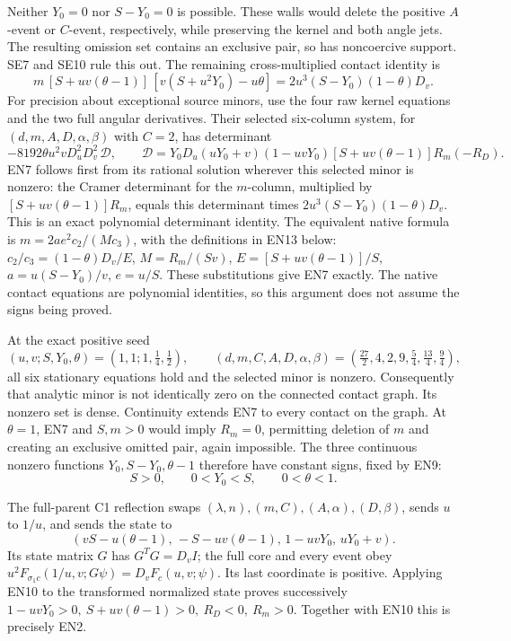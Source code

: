 Neither \(Y_0=0\) nor \(S-Y_0=0\) is possible.  These walls would delete
the positive \(A\)-event or \(C\)-event, respectively, while preserving
the kernel and both angle jets.  The resulting omission set contains
an exclusive pair, so has noncoercive support.  SE7 and SE10 rule this out.
The remaining cross-multiplied contact identity is
\[
 m\,[S+uv(\theta-1)]\,
       [v(S+u^2Y_0)-u\theta]
   =2u^3(S-Y_0)(1-\theta)D_v .
 \tag{EN7}
\]
For precision about exceptional source minors, use the four raw kernel
equations and the two full angular derivatives.  Their selected six-column
system, for \((d,m,A,D,\alpha,\beta)\) with \(C=2\), has
determinant
\[
 -8192\theta u^2vD_u^2D_v^2\,\mathcal D,\qquad
 \mathcal D=Y_0D_u(uY_0+v)(1-uvY_0)
 [S+uv(\theta-1)]R_m(-R_D).
 \tag{EN8}
\]
EN7 follows first from its rational solution wherever this selected
minor is nonzero: the Cramer determinant for the \(m\)-column,
multiplied by \([S+uv(\theta-1)]R_m\), equals this determinant
times \(2u^3(S-Y_0)(1-\theta)D_v\).  This is an exact
polynomial determinant identity.  The equivalent native formula is
\(m=2ae^2c_2/(Mc_3)\), with the definitions in EN13 below:
\(c_2/c_3=(1-\theta)D_v/E\),
\(M=R_m/(Sv)\), \(E=[S+uv(\theta-1)]/S\),
\(a=u(S-Y_0)/v\), \(e=u/S\).  These substitutions give EN7
exactly.  The native contact equations are polynomial identities, so
this argument does not assume the signs being proved.

At the exact positive seed
\[
 (u,v;S,Y_0,\theta)=(1,1;1,\tfrac14,\tfrac12),\qquad
 (d,m,C,A,D,\alpha,\beta)
 =(\tfrac{27}2,4,2,9,\tfrac54,\tfrac{13}4,\tfrac94),
 \tag{EN9}
\]
all six stationary equations hold and the selected minor is nonzero.
Consequently that analytic minor is not identically zero on the
connected contact graph.  Its nonzero set is dense.  Continuity extends
EN7 to every contact on the graph.  At \(\theta=1\), EN7 and \(S,m>0\)
would imply \(R_m=0\), permitting deletion of \(m\) and creating an
exclusive omitted pair, again impossible.  The three continuous
nonzero functions \(Y_0,S-Y_0,\theta-1\) therefore have constant signs,
fixed by EN9:
\[
 S>0,\qquad 0<Y_0<S,\qquad 0<\theta<1.
 \tag{EN10}
\]

The full-parent C1 reflection swaps
\((\lambda,n),(m,C),(A,\alpha),(D,\beta)\), sends \(u\) to \(1/u\),
and sends the state to
\[
 (vS-u(\theta-1),\,-S-uv(\theta-1),\,
                   1-uvY_0,\,uY_0+v).
\]
Its state matrix \(G\) has \(G^TG=D_vI\); the full core and every event
obey \(u^2F_{\sigma_1c}(1/u,v;G\psi)=D_vF_c(u,v;\psi)\).
Its last coordinate is positive.
Applying EN10 to the transformed normalized state proves successively
\(1-uvY_0>0,\ S+uv(\theta-1)>0,\ R_D<0,\ R_m>0\).
Together with EN10 this is precisely EN2.

